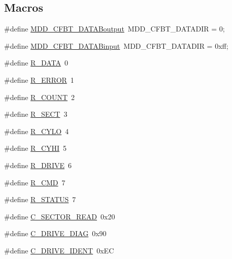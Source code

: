 \subsection*{Macros}
\begin{DoxyCompactItemize}
\item 
\#define \hyperlink{_c_f-_01_bit_01transaction_8h_a41fbe181036691e284ce0b3a6c66a996}{M\+D\+D\+\_\+\+C\+F\+B\+T\+\_\+\+D\+A\+T\+A\+Boutput}~M\+D\+D\+\_\+\+C\+F\+B\+T\+\_\+\+D\+A\+T\+A\+D\+I\+R = 0;
\item 
\#define \hyperlink{_c_f-_01_bit_01transaction_8h_aed5d608ab48cc40aca7d6981252d7c64}{M\+D\+D\+\_\+\+C\+F\+B\+T\+\_\+\+D\+A\+T\+A\+Binput}~M\+D\+D\+\_\+\+C\+F\+B\+T\+\_\+\+D\+A\+T\+A\+D\+I\+R = 0xff;
\item 
\#define \hyperlink{_c_f-_01_bit_01transaction_8h_ac51dc180dde0fcda153d9e61f5c0f2f8}{R\+\_\+\+D\+A\+T\+A}~0
\item 
\#define \hyperlink{_c_f-_01_bit_01transaction_8h_ae49fbda11f529ae6d8a581b6e0fd1a75}{R\+\_\+\+E\+R\+R\+O\+R}~1
\item 
\#define \hyperlink{_c_f-_01_bit_01transaction_8h_a0cb64f6ffafe32f3ef2b7a7b1051b591}{R\+\_\+\+C\+O\+U\+N\+T}~2
\item 
\#define \hyperlink{_c_f-_01_bit_01transaction_8h_a2d8f9df446db95fd0706bf4ec03414c7}{R\+\_\+\+S\+E\+C\+T}~3
\item 
\#define \hyperlink{_c_f-_01_bit_01transaction_8h_a970d3f9d433a03b1978c39ff42b70fa2}{R\+\_\+\+C\+Y\+L\+O}~4
\item 
\#define \hyperlink{_c_f-_01_bit_01transaction_8h_ab81360234f216f08abe4f84bc2cd15bd}{R\+\_\+\+C\+Y\+H\+I}~5
\item 
\#define \hyperlink{_c_f-_01_bit_01transaction_8h_a1b75a52bc066351024467526af17a4e0}{R\+\_\+\+D\+R\+I\+V\+E}~6
\item 
\#define \hyperlink{_c_f-_01_bit_01transaction_8h_acc6fa55e6ee7e4b6adc5fdc8928b5dd9}{R\+\_\+\+C\+M\+D}~7
\item 
\#define \hyperlink{_c_f-_01_bit_01transaction_8h_aef698ae444239bc08e1975c5dfd9dbe0}{R\+\_\+\+S\+T\+A\+T\+U\+S}~7
\item 
\#define \hyperlink{_c_f-_01_bit_01transaction_8h_abe7e650a18acb80c9691f309da6dd95b}{C\+\_\+\+S\+E\+C\+T\+O\+R\+\_\+\+R\+E\+A\+D}~0x20
\item 
\#define \hyperlink{_c_f-_01_bit_01transaction_8h_a97dcd644c5d9c9767c6c63c3d16842a2}{C\+\_\+\+D\+R\+I\+V\+E\+\_\+\+D\+I\+A\+G}~0x90
\item 
\#define \hyperlink{_c_f-_01_bit_01transaction_8h_a89ddf92d78e74d55f0a44e0ce8df18f3}{C\+\_\+\+D\+R\+I\+V\+E\+\_\+\+I\+D\+E\+N\+T}~0x\+E\+C

\end{DoxyCompactItemize}
